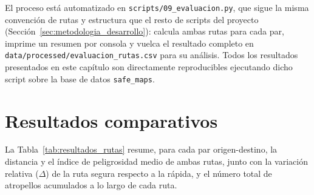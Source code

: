 El proceso está automatizado en \texttt{scripts/09\_evaluacion.py}, que sigue la misma convención de rutas y estructura que el resto de scripts del proyecto (Sección~\ref{sec:metodologia_desarrollo}): calcula ambas rutas para cada par, imprime un resumen por consola y vuelca el resultado completo en \texttt{data/processed/evaluacion\_rutas.csv} para su análisis. Todos los resultados presentados en este capítulo son directamente reproducibles ejecutando dicho script sobre la base de datos \texttt{safe\_maps}.

\section{Resultados comparativos}
\label{sec:resultados_comparativos}

La Tabla~\ref{tab:resultados_rutas} resume, para cada par origen-destino, la distancia y el índice de peligrosidad medio de ambas rutas, junto con la variación relativa ($\Delta$) de la ruta segura respecto a la rápida, y el número total de atropellos acumulados a lo largo de cada ruta.

